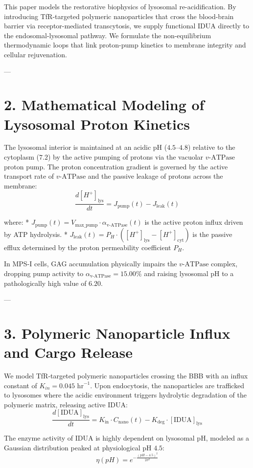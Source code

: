 \documentclass[11pt,twocolumn]{article}
\begin{document}
This paper models the restorative biophysics of lysosomal re-acidification. By introducing TfR-targeted polymeric nanoparticles that cross the blood-brain barrier via receptor-mediated transcytosis, we supply functional IDUA directly to the endosomal-lysosomal pathway. We formulate the non-equilibrium thermodynamic loops that link proton-pump kinetics to membrane integrity and cellular rejuvenation.

---

\section{2. Mathematical Modeling of Lysosomal Proton Kinetics}
The lysosomal interior is maintained at an acidic pH ($4.5\text{--}4.8$) relative to the cytoplasm ($7.2$) by the active pumping of protons via the vacuolar $v\text{-ATPase}$ proton pump. The proton concentration gradient is governed by the active transport rate of $v\text{-ATPase}$ and the passive leakage of protons across the membrane:
$$\frac{d[H^+]_{\text{lys}}}{dt} = J_{\text{pump}}(t) - J_{\text{leak}}(t)$$

where:
*   $J_{\text{pump}}(t) = V_{\text{max\_pump}} \cdot \alpha_{\text{v-ATPase}}(t)$ is the active proton influx driven by ATP hydrolysis.
*   $J_{\text{leak}}(t) = P_H \cdot \left([H^+]_{\text{lys}} - [H^+]_{\text{cyt}}\right)$ is the passive efflux determined by the proton permeability coefficient $P_H$.

In MPS-I cells, GAG accumulation physically impairs the $v\text{-ATPase}$ complex, dropping pump activity to $\alpha_{\text{v-ATPase}} = 15.00\%$ and raising lysosomal pH to a pathologically high value of $6.20$.

---

\section{3. Polymeric Nanoparticle Influx and Cargo Release}
We model TfR-targeted polymeric nanoparticles crossing the BBB with an influx constant of $K_{in} = 0.045\text{ hr}^{-1}$. Upon endocytosis, the nanoparticles are trafficked to lysosomes where the acidic environment triggers hydrolytic degradation of the polymeric matrix, releasing active IDUA:
$$\frac{d[\text{IDUA}]_{\text{lys}}}{dt} = K_{\text{in}} \cdot C_{\text{nano}}(t) - K_{\text{deg}} \cdot [\text{IDUA}]_{\text{lys}}$$

The enzyme activity of IDUA is highly dependent on lysosomal pH, modeled as a Gaussian distribution peaked at physiological pH $4.5$:
$$\eta(pH) = e^{-\frac{(pH - 4.5)^2}{2 \sigma^2}}$$
\end{document}
